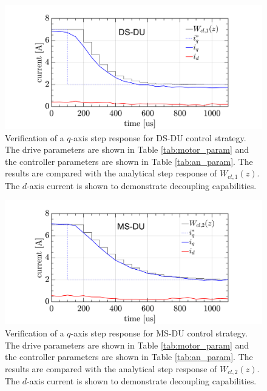 \documentclass[conference]{IEEEtran}
\begin{document}
\begin{figure}[t!]
    \centerline{\includegraphics[width=1\linewidth]{figures/ivan figs/DSDUstepHIL.png}}
    \caption{Verification of a $q$-axis step response for DS-DU control strategy. The drive parameters are shown in Table \ref{tab:motor_param} and the controller parameters are shown in Table \ref{tab:an_param}. The results are compared with the analytical step response of $W_{cl,1}(z)$. The $d$-axis current is shown to demonstrate decoupling capabilities.}
    \label{fig:DSDU_step} 
\end{figure}
\begin{figure}[t!]
    \centerline{\includegraphics[width=1\linewidth]{figures/ivan figs/MSDUstepHIL.png}}
    \caption{Verification of a $q$-axis step response for MS-DU control strategy. The drive parameters are shown in Table \ref{tab:motor_param} and the controller parameters are shown in Table \ref{tab:an_param}. The results are compared with the analytical step response of $W_{cl,2}(z)$. The $d$-axis current is shown to demonstrate decoupling capabilities.}
    \label{fig:MSDU_step} 
\end{figure}
\end{document}
